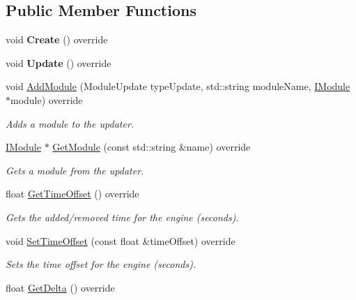 \subsection*{Public Member Functions}
\begin{DoxyCompactItemize}
\item 
\mbox{\label{class_flounder_1_1_glfw_updater_ac437d87210f9d77e4b94ee372dd0110f}} 
void {\bfseries Create} () override
\item 
\mbox{\label{class_flounder_1_1_glfw_updater_a08ffa7d53deacd46e1b76447c5062ecb}} 
void {\bfseries Update} () override
\item 
void \hyperlink{class_flounder_1_1_glfw_updater_a02a057128ab993d1b3fa397bbbf79ebf}{Add\+Module} (Module\+Update type\+Update, std\+::string module\+Name, \hyperlink{class_flounder_1_1_i_module}{I\+Module} $\ast$module) override
\begin{DoxyCompactList}\small\item\em Adds a module to the updater. \end{DoxyCompactList}\item 
\hyperlink{class_flounder_1_1_i_module}{I\+Module} $\ast$ \hyperlink{class_flounder_1_1_glfw_updater_a7dbe6de40b5596a8f6501235645807ed}{Get\+Module} (const std\+::string \&name) override
\begin{DoxyCompactList}\small\item\em Gets a module from the updater. \end{DoxyCompactList}\item 
float \hyperlink{class_flounder_1_1_glfw_updater_a226e133e14bd058d07e0d19003371c0d}{Get\+Time\+Offset} () override
\begin{DoxyCompactList}\small\item\em Gets the added/removed time for the engine (seconds). \end{DoxyCompactList}\item 
void \hyperlink{class_flounder_1_1_glfw_updater_add7ecb2ba97449eb4b2de6e86a48c1a8}{Set\+Time\+Offset} (const float \&time\+Offset) override
\begin{DoxyCompactList}\small\item\em Sets the time offset for the engine (seconds). \end{DoxyCompactList}\item 
float \hyperlink{class_flounder_1_1_glfw_updater_a284e6c2b196dff837f01bd82e93eaeb6}{Get\+Delta} () override

\end{DoxyCompactItemize}
